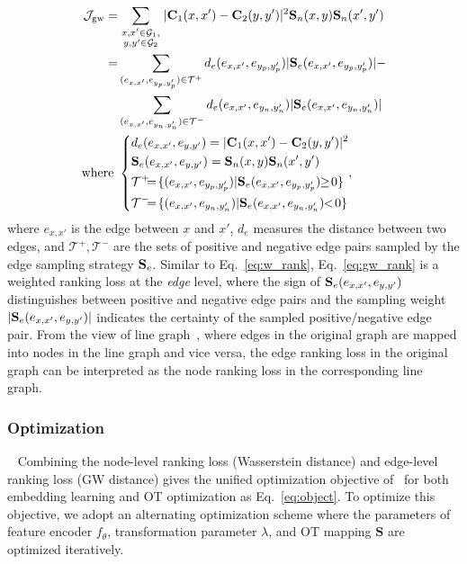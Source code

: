 \vspace{-10pt}
\begin{equation}\label{eq:gw_rank}
\begin{aligned}
    \mathcal{J}_{\text{gw}}=&\sum_{\substack{x, x'\in\mathcal{G}_1,\atop y,y'\in\mathcal{G}_2}}|\mathbf{C}_1(x, x')-\mathbf{C}_2(y, y')|^2\sn(x, y)\sn(x', y')\\
    =&\sum_{(e_{x,x'},e_{y_p,y_p'})\in\mathcal{T}^+}d_e(e_{x,x'},e_{y_p,y_p'})|\se(e_{x,x'},e_{y_p,y_p'})| -\\
    &\sum_{(e_{x,x'},e_{y_n,y_n'})\in\mathcal{T}^-}d_e(e_{x,x'},e_{y_n,y_n'})|\se(e_{x,x'},e_{y_n,y_n'})|\\
    \text{where }&\left\{
    \begin{aligned}
        &d_e(e_{x,x'},e_{y,y'})=|\mathbf{C}_1(x,x')-\mathbf{C}_2(y,y')|^2\\
        &\se(e_{x,x'},e_{y,y'})=\sn(x,y)\sn(x',y')\\
        &\mathcal{T}^+\!\!\!=\!\{(e_{x,x'},e_{y_p,y_p'}) |\se(e_{x,x'},e_{y_p,y_p'}) \!\!\geq\! 0\}\\
        &\mathcal{T}^-\!\!\!=\!\{(e_{x,x'},e_{y_n,y_n'}) | \se(e_{x,x'},e_{y_n,y_n'}) \!\!<\! 0\}
    \end{aligned},
    \right.
\end{aligned}
\end{equation}
\noindent where $e_{x,x'}$ is the edge between $x$ and $x'$, $d_e$ measures the distance between two edges, and $\mathcal{T}^+,\mathcal{T}^-$ are the sets of positive and negative edge pairs sampled by the edge sampling strategy $\mathbf{S}_e$.
Similar to Eq.~\eqref{eq:w_rank}, Eq.~\eqref{eq:gw_rank} is a weighted ranking loss at the \textit{edge} level, where the sign of $\mathbf{S}_e(e_{x,x'},e_{y,y'})$ distinguishes between positive and negative edge pairs and the sampling weight $|\mathbf{S}_e(e_{x,x'},e_{y,y'})|$ indicates the certainty of the sampled positive/negative edge pair.
From the view of line graph~\cite{dlna}, where edges in the original graph are mapped into nodes in the line graph and vice versa, the edge ranking loss in the original graph can be interpreted as the node ranking loss in the corresponding line graph.

\subsubsection{Optimization}~\label{subsection:modeltraining}
Combining the node-level ranking loss (Wasserstein distance) and edge-level ranking loss (GW distance) gives the unified optimization objective of \algname\ for both embedding learning and OT optimization as Eq.~\eqref{eq:object}. To optimize this objective, we adopt an alternating optimization scheme where the parameters of feature encoder $f_\theta$, transformation parameter $\lambda$, and OT mapping $\mathbf{S}$ are optimized iteratively.

